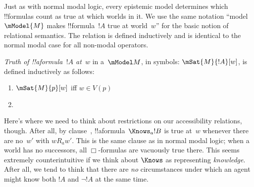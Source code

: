 \documentclass[../../../include/open-logic-section]{subfiles}
\begin{document}


Just as with normal modal logic, every epistemic model determines which !!{formula}s count as true at
which worlds in it. We use the same notation ``model $\mModel{M}$ makes
!!{formula}~$!A$ true at world~$w$'' for the basic notion of relational
semantics. The relation is defined inductively and is identical to the normal modal case for all non-modal operators.

\begin{defn}
  \emph{Truth of !!a{formula}~$!A$ at~$w$} in a~$\mModel M$, in symbols:
  $\mSat{M}{!A}[w]$, is defined inductively as follows:
  \begin{enumerate}
  \item $\mSat{M}{p}[w]$ iff $w \in V(p)$
  \item{}
  \end{enumerate} 
\end{defn}

Here's where we need to think about restrictions on our accessibility
relations, though. After all, by clause~,
!!a{formula}~$\Knows_a !B$ is true at~$w$ whenever there are no~$w'$
with $wR_aw'$. This is the same clause as in normal modal logic; when
a world has no successors, all $\Box$-formulas are vacuously true
there. This seems extremely counterintuitive if we think about
$\Knows$ as representing \emph{knowledge}. After all, we tend to think
that there are \emph{no} circumstances under which an agent might know
both $!A$ and $\lnot !A$ at the same time.
\end{document}
